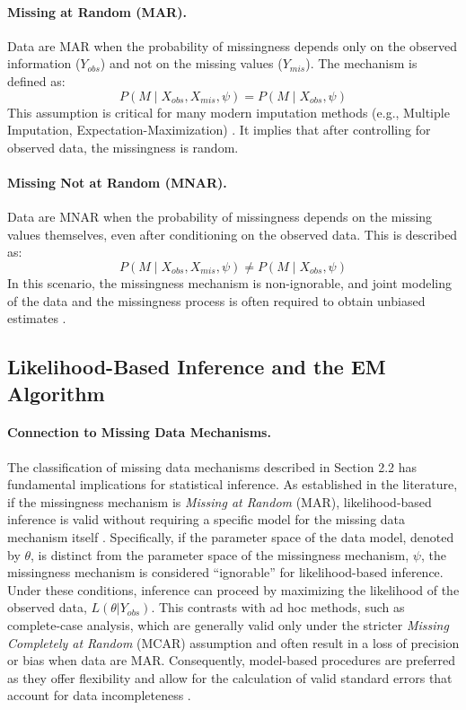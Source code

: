 \documentclass[11pt, a4paper]{article}
\begin{document}
\paragraph{Missing at Random (MAR).}
Data are MAR when the probability of missingness depends only on the observed information ($Y_{obs}$) and not on the missing values ($Y_{mis}$).
The mechanism is defined as:
\begin{equation}
P(M \mid X_{obs}, X_{mis}, \psi) = P(M \mid X_{obs}, \psi)
\end{equation}
This assumption is critical for many modern imputation methods (e.g., Multiple Imputation, Expectation-Maximization) \citep{LittleRubin2019}.
It implies that after controlling for observed data, the missingness is random.

\paragraph{Missing Not at Random (MNAR).}
Data are MNAR when the probability of missingness depends on the missing values themselves, even after conditioning on the observed data.
This is described as:
\begin{equation}
P(M \mid X_{obs}, X_{mis}, \psi) \neq P(M \mid X_{obs}, \psi)
\end{equation}
In this scenario, the missingness mechanism is non-ignorable, and joint modeling of the data and the missingness process is often required to obtain unbiased estimates \citep{LittleRubin2019}.

\subsection{Likelihood-Based Inference and the EM Algorithm}

\paragraph{Connection to Missing Data Mechanisms.}
The classification of missing data mechanisms described in Section 2.2 has fundamental implications for statistical inference.
As established in the literature, if the missingness mechanism is \textit{Missing at Random} (MAR), likelihood-based inference is valid without requiring a specific model for the missing data mechanism itself \citep{LittleRubin2019}.
Specifically, if the parameter space of the data model, denoted by $\theta$, is distinct from the parameter space of the missingness mechanism, $\psi$, the missingness mechanism is considered ``ignorable'' for likelihood-based inference.
Under these conditions, inference can proceed by maximizing the likelihood of the observed data, $L(\theta | Y_{obs})$.
This contrasts with ad hoc methods, such as complete-case analysis, which are generally valid only under the stricter \textit{Missing Completely at Random} (MCAR) assumption and often result in a loss of precision or bias when data are MAR.
Consequently, model-based procedures are preferred as they offer flexibility and allow for the calculation of valid standard errors that account for data incompleteness \citep{LittleRubin2019}.
\end{document}
